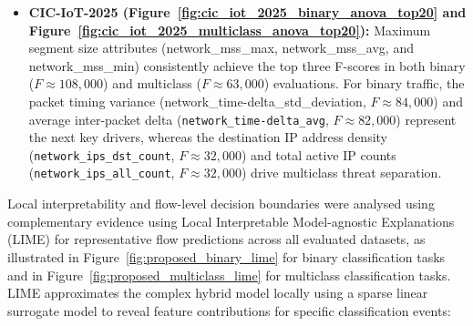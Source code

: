 \documentclass[a4paper,fleqn]{cas-sc}
\begin{document}
\begin{itemize}
    \item \textbf{CIC-IoT-2025 (Figure~\ref{fig:cic_iot_2025_binary_anova_top20} and Figure~\ref{fig:cic_iot_2025_multiclass_anova_top20}):} Maximum segment size attributes (network\_mss\_max, network\_mss\_avg, and network\_mss\_min) consistently achieve the top three F-scores in both binary ($F \approx 108,000$) and multiclass ($F \approx 63,000$) evaluations. For binary traffic, the packet timing variance (network\_time-delta\_std\_deviation, $F \approx 84,000$) and average inter-packet delta (\texttt{network\_time-delta\_avg}, $F \approx 82,000$) represent the next key drivers, whereas the destination IP address density (\texttt{network\_ips\_dst\_count}, $F \approx 32,000$) and total active IP counts (\texttt{network\_ips\_all\_count}, $F \approx 32,000$) drive multiclass threat separation.
\end{itemize}

Local interpretability and flow-level decision boundaries were analysed using complementary evidence using Local Interpretable Model-agnostic Explanations (LIME) for representative flow predictions across all evaluated datasets, as illustrated in Figure~\ref{fig:proposed_binary_lime} for binary classification tasks and in Figure~\ref{fig:proposed_multiclass_lime} for multiclass classification tasks. LIME approximates the complex hybrid model locally using a sparse linear surrogate model to reveal feature contributions for specific classification events:
\end{document}
